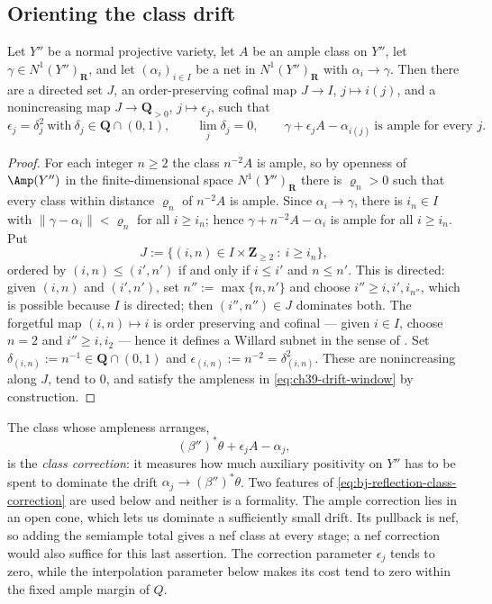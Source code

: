 \subsection{Orienting the class drift}
\label{sec:ch39-drift}

\begin{lemma}
\label{lem:ch39-drift-window}
Let $Y''$ be a normal projective variety, let $A$ be an ample class on
$Y''$, let $\gamma\in N^1(Y'')_{\mathbf R}$, and let
$(\alpha_i)_{i\in I}$ be a net in $N^1(Y'')_{\mathbf R}$ with
$\alpha_i\to\gamma$.  Then there are a directed set $J$, an
order-preserving cofinal map $J\to I$, $j\mapsto i(j)$, and a
nonincreasing map $J\to\mathbf Q_{>0}$, $j\mapsto\epsilon_j$, such that
\[
 \epsilon_j=\delta_j^2\ \text{with}\ \delta_j\in\mathbf Q\cap(0,1),
 \qquad
 \lim_j\delta_j=0,
 \qquad
 \gamma+\epsilon_jA-\alpha_{i(j)}\ \text{is ample for every }j.
\tag{39.8}\label{eq:ch39-drift-window}
\]
\end{lemma}

\begin{proof}
For each integer $n\ge2$ the class $n^{-2}A$ is ample, so by openness of
$\Amp(Y'')$ in the finite-dimensional space $N^1(Y'')_{\mathbf R}$ there
is $\varrho_n>0$ such that every class within distance $\varrho_n$ of
$n^{-2}A$ is ample.  Since $\alpha_i\to\gamma$, there is $i_n\in I$
with $\|\gamma-\alpha_i\|<\varrho_n$ for all $i\ge i_n$; hence
$\gamma+n^{-2}A-\alpha_i$ is ample for all $i\ge i_n$.  Put
\[
 J:=\{(i,n)\in I\times\mathbf Z_{\ge2}\ :\ i\ge i_n\},
\]
ordered by $(i,n)\le(i',n')$ if and only if $i\le i'$ and $n\le n'$.
This is directed: given $(i,n)$ and $(i',n')$, set
$n'':=\max\{n,n'\}$ and choose $i''\ge i,i',i_{n''}$, which is possible
because $I$ is directed; then $(i'',n'')\in J$ dominates both.  The
forgetful map $(i,n)\mapsto i$ is order preserving and cofinal --- given
$i\in I$, choose $n=2$ and $i''\ge i,i_2$ --- hence it defines a
Willard subnet in the sense of .  Set
$\delta_{(i,n)}:=n^{-1}\in\mathbf Q\cap(0,1)$ and
$\epsilon_{(i,n)}:=n^{-2}=\delta_{(i,n)}^2$.  These are nonincreasing
along $J$, tend to $0$, and satisfy the ampleness in
\eqref{eq:ch39-drift-window} by construction.
\end{proof}

The class whose ampleness  arranges,
\[
                 (\beta'')^*\theta+\epsilon_jA-\alpha_j,
\tag{39.9}\label{eq:bj-reflection-class-correction}
\]
is the \emph{class correction}: it measures how much auxiliary positivity on
$Y''$ has to be spent to dominate the drift $\alpha_j\to(\beta'')^*\theta$.
Two features of \eqref{eq:bj-reflection-class-correction} are used below and
neither is a formality.  The ample correction lies in an open cone,
which lets us dominate a sufficiently small drift.  Its pullback is nef,
so adding the semiample total gives a nef class at every stage; a nef
correction would also suffice for this last assertion.  The correction
parameter $\epsilon_j$ tends to zero, while the interpolation parameter
below makes its cost tend to zero within the fixed ample margin of $Q$.

